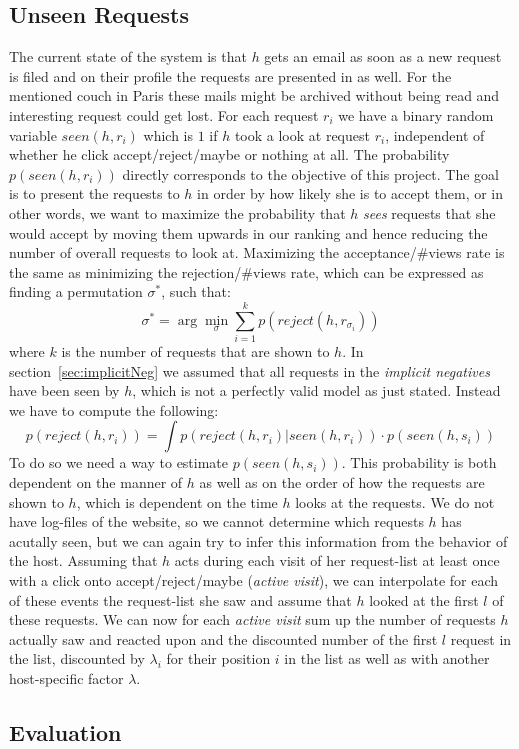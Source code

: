 \documentclass[11pt]{article}
\begin{document}
\subsection{Unseen Requests}
\label{sec:unseen}
The current state of the system is that $h$ gets an email as soon as a new request is filed and on their profile the requests are presented in  as well. For the mentioned couch in Paris these mails might be archived without being read and interesting request could get lost. For each request $r_i$ we have a binary random variable $seen(h, r_i)$ which is $1$ if $h$ took a look at request $r_i$, independent of whether he click accept/reject/maybe or nothing at all. The probability $p(seen(h,r_i))$ directly corresponds to the objective of this project. The goal is to present the requests to $h$ in order by how likely she is to accept them, or in other words, we want to maximize the probability that $h$ \textit{sees} requests that she would accept by moving them upwards in our ranking and hence reducing the number of overall requests to look at. Maximizing the acceptance/\#views rate is the same as minimizing the rejection/\#views rate, which can be expressed as finding a permutation $\sigma^*$, such that:
$$\sigma^* = \arg\min_{\sigma}\sum_{i=1}^k p(reject(h, r_{\sigma_i}))$$
where $k$ is the number of requests that are shown to $h$. 
In section~\ref{sec:implicitNeg} we assumed that all requests in the \textit{implicit negatives} have been seen by $h$, which is not a perfectly valid model as just stated. Instead we have to compute the following:
$$p(reject(h, r_i)) = \int p(reject(h, r_i)|seen(h, r_i))\cdot p(seen(h, s_i))$$
To do so we need a way to estimate $p(seen(h,s_i))$. This probability is both dependent on the manner of $h$ as well as on the order of how the requests are shown to $h$, which is dependent on the time $h$ looks at the requests. We do not have log-files of the website, so we cannot determine which requests $h$ has acutally seen, but we can again try to infer this information from the behavior of the host. Assuming that $h$ acts during each visit of her request-list at least once with a click onto accept/reject/maybe (\textit{active visit}), we can interpolate for each of these events the request-list she saw and assume that $h$ looked at the first $l$ of these requests. We can now for each \textit{active visit} sum up the number of requests $h$ actually saw and reacted upon and the discounted number of the first $l$ request in the list, discounted by $\lambda_i$ for their position $i$ in the list as well as with another host-specific factor $\lambda$.

\subsection{Evaluation}


\small

\end{document}
